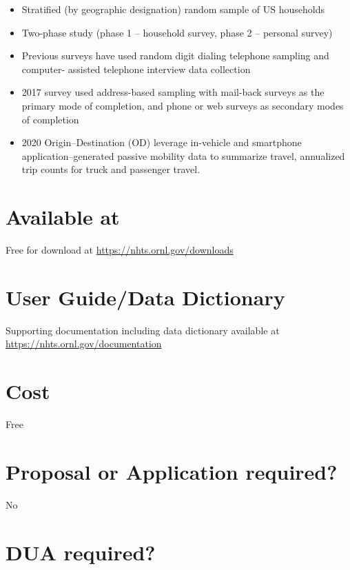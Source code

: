 \documentclass[
]{book}
\providecommand{\tightlist}{%
  \setlength{\itemsep}{0pt}\setlength{\parskip}{0pt}}
\begin{document}
\begin{itemize}
\tightlist
\item
  Stratified (by geographic designation) random sample of US households
\item
  Two-phase study (phase 1 -- household survey, phase 2 -- personal survey)
\item
  Previous surveys have used random digit dialing telephone sampling and computer- assisted telephone interview data collection
\item
  2017 survey used address-based sampling with mail-back surveys as the primary mode of completion, and phone or web surveys as secondary modes of completion
\item
  2020 Origin--Destination (OD) leverage in-vehicle and smartphone application--generated passive mobility data to summarize travel, annualized trip counts for truck and passenger travel.
\end{itemize}

\hypertarget{available-at-53}{%
\section{Available at}\label{available-at-53}}

Free for download at \url{https://nhts.ornl.gov/downloads}

\hypertarget{user-guidedata-dictionary-53}{%
\section{User Guide/Data Dictionary}\label{user-guidedata-dictionary-53}}

Supporting documentation including data dictionary available at \url{https://nhts.ornl.gov/documentation}

\hypertarget{cost-53}{%
\section{Cost}\label{cost-53}}

Free

\hypertarget{proposal-or-application-required-53}{%
\section{Proposal or Application required?}\label{proposal-or-application-required-53}}

No

\hypertarget{dua-required-53}{%
\section{DUA required?}\label{dua-required-53}}
\end{document}
